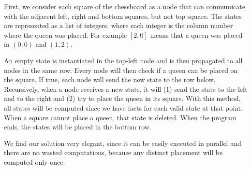 First, we consider each square of the chessboard as a node
that can communicate with the adjacent left, right and bottom squares, but not top square.
The states are represented as a list of integers, where each integer is the column number where
the queen was placed. For example $[2, 0]$ means that a queen was placed in $(0, 0)$ and $(1, 2)$.

An empty state is instantiated in the top-left node and is then propagated to all nodes in the same row.
Every node will then check if a queen can be placed on the square. If true, each node will send the new
state to the row below.
Recursively, when a node receives a new state, it will (1) send the state to the left
and to the right and (2) try to place the queen in its square. With this method,
all states will be computed since we have facts for each valid state
at that point. When a square cannot place a queen, that state is deleted.
When the program ends, the states will be placed in the bottom row.

We find our solution very elegant, since it can be easily executed in parallel and there are no
wasted computations, because any distinct placement will be computed only once.

